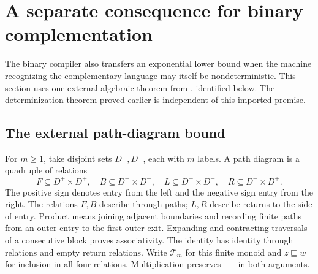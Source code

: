 \section{A separate consequence for binary complementation}
\label{btc:complement:section}

The binary compiler also transfers an exponential lower bound when
the machine recognizing the complementary language may itself be
nondeterministic. This section uses one external algebraic theorem
from \cite{OpenAIComplement2026}, identified below. The determinization
theorem proved earlier is independent of this imported premise.

\subsection{The external path-diagram bound}

For $m\ge1$, take disjoint sets $D^+,D^-$, each with $m$ labels.
A path diagram is a quadruple of relations
\[
 F\subseteq D^+\times D^+,\quad
 B\subseteq D^-\times D^-,\quad
 L\subseteq D^+\times D^-,\quad
 R\subseteq D^-\times D^+.
\]
The positive sign denotes entry from the left and the negative sign
entry from the right. The relations $F,B$ describe through paths;
$L,R$ describe returns to the side of entry. Product means joining
adjacent boundaries and recording finite paths from an outer entry
to the first outer exit. Expanding and contracting traversals of a
consecutive block proves associativity. The identity has identity
through relations and empty return relations. Write $\mathcal T_m$
for this finite monoid and $z\sqsubseteq w$ for inclusion in all four
relations. Multiplication preserves $\sqsubseteq$ in both arguments.

\begin{center}
\end{center}


